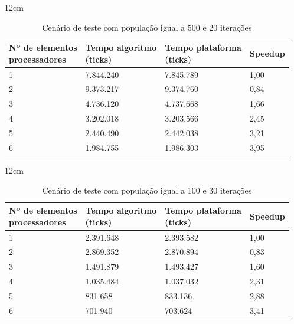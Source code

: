 \begin{table}[h]{12cm}
    \caption{Cenário de teste com população igual a 500 e 20 iterações}
    \label{cenario5}
    \begin{tabular}{llll}
        \hline
        \shortstack[l]{Nº de elementos \\ processadores} & \shortstack[l]{Tempo algoritmo \\ (ticks)} & \shortstack[l]{Tempo plataforma \\ (ticks)} & Speedup \\
        \hline
        1 & 7.844.240 & 7.845.789 & 1,00 \\
        2 & 9.373.217 & 9.374.760 & 0,84 \\
        3 & 4.736.120 & 4.737.668 &	1,66 \\
        4 & 3.202.018 & 3.203.566 & 2,45 \\
        5 & 2.440.490 & 2.442.038 & 3,21 \\
        6 & 1.984.755 & 1.986.303 & 3,95 \\
        \hline
    \end{tabular}
\end{table}


\begin{table}[h]{12cm}
    \caption{Cenário de teste com população igual a 100 e 30 iterações}
    \label{cenario6}
    \begin{tabular}{llll}
        \hline
        \shortstack[l]{Nº de elementos \\ processadores} & \shortstack[l]{Tempo algoritmo \\ (ticks)} & \shortstack[l]{Tempo plataforma \\ (ticks)} & Speedup \\
        \hline
        1 & 2.391.648 & 2.393.582 & 1,00 \\
        2 & 2.869.352 & 2.870.894 & 0,83 \\
        3 & 1.491.879 & 1.493.427 &	1,60 \\
        4 & 1.035.484 & 1.037.032 & 2,31 \\
        5 & 831.658   & 833.136   & 2,88 \\
        6 & 701.940   & 703.624   & 3,41 \\
        \hline
    \end{tabular}
\end{table}

